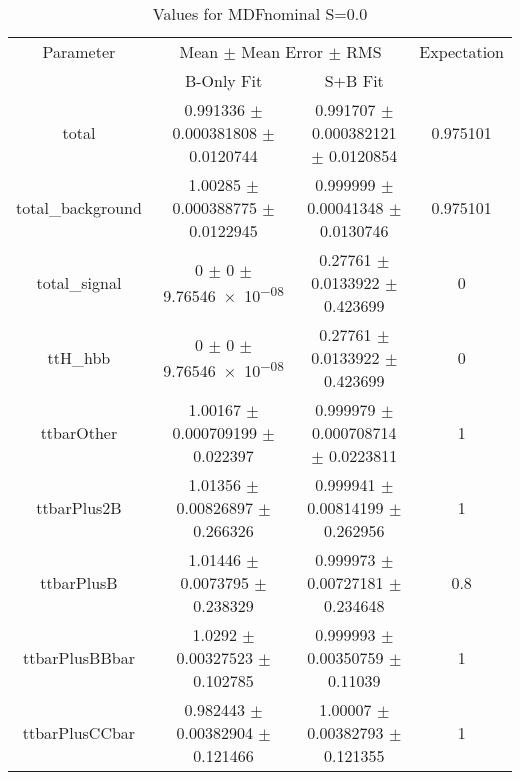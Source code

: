 \begin{table}
\centering
\caption{Values for MDFnominal S=0.0}
\begin{tabular}{cccc}
\toprule
Parameter & \multicolumn{2}{c}{Mean $\pm$ Mean Error $\pm$ RMS} & Expectation\\
 & B-Only Fit & S+B Fit & \\
\midrule
total & \num{0.991336} $\pm$ \num{0.000381808} $\pm$ \num{0.0120744} & \num{0.991707} $\pm$ \num{0.000382121} $\pm$ \num{0.0120854} & \num{0.975101}\\
total\_background & \num{1.00285} $\pm$ \num{0.000388775} $\pm$ \num{0.0122945} & \num{0.999999} $\pm$ \num{0.00041348} $\pm$ \num{0.0130746} & \num{0.975101}\\
total\_signal & \num{0} $\pm$ \num{0} $\pm$ \num{9.76546e-08} & \num{0.27761} $\pm$ \num{0.0133922} $\pm$ \num{0.423699} & \num{0}\\
ttH\_hbb & \num{0} $\pm$ \num{0} $\pm$ \num{9.76546e-08} & \num{0.27761} $\pm$ \num{0.0133922} $\pm$ \num{0.423699} & \num{0}\\
ttbarOther & \num{1.00167} $\pm$ \num{0.000709199} $\pm$ \num{0.022397} & \num{0.999979} $\pm$ \num{0.000708714} $\pm$ \num{0.0223811} & \num{1}\\
ttbarPlus2B & \num{1.01356} $\pm$ \num{0.00826897} $\pm$ \num{0.266326} & \num{0.999941} $\pm$ \num{0.00814199} $\pm$ \num{0.262956} & \num{1}\\
ttbarPlusB & \num{1.01446} $\pm$ \num{0.0073795} $\pm$ \num{0.238329} & \num{0.999973} $\pm$ \num{0.00727181} $\pm$ \num{0.234648} & \num{0.8}\\
ttbarPlusBBbar & \num{1.0292} $\pm$ \num{0.00327523} $\pm$ \num{0.102785} & \num{0.999993} $\pm$ \num{0.00350759} $\pm$ \num{0.11039} & \num{1}\\
ttbarPlusCCbar & \num{0.982443} $\pm$ \num{0.00382904} $\pm$ \num{0.121466} & \num{1.00007} $\pm$ \num{0.00382793} $\pm$ \num{0.121355} & \num{1}\\
\bottomrule
\end{tabular}
\end{table}